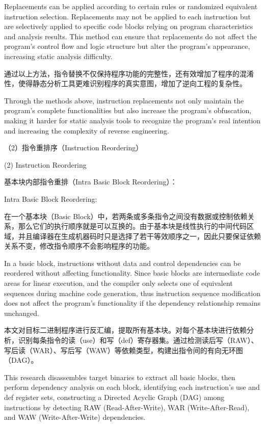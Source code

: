Replacements can be applied according to certain rules or randomized equivalent instruction selection. Replacements may not be applied to each instruction but are selectively applied to specific code blocks relying on program characteristics and analysis results. This method can ensure that replacements do not affect the program's control flow and logic structure but alter the program's appearance, increasing static analysis difficulty.

通过以上方法，指令替换不仅保持程序功能的完整性，还有效增加了程序的混淆性，使得静态分析工具更难识别程序的真实意图，增加了逆向工程的复杂性。

Through the methods above, instruction replacements not only maintain the program's complete functionalities but also increase the program's obfuscation, making it harder for static analysis tools to recognize the program's real intention and increasing the complexity of reverse engineering.

（2）指令重排序（Instruction Reordering）

(2) Instruction Reordering

基本块内部指令重排（Intra Basic Block Reordering）：

Intra Basic Block Reordering:

在一个基本块（Basic Block）中，若两条或多条指令之间没有数据或控制依赖关系，那么它们的执行顺序就是可以互换的。由于基本块是线性执行的中间代码区域，并且编译器在生成机器码时只是选择了若干等效顺序之一，因此只要保证依赖关系不变，修改指令顺序不会影响程序的功能。

In a basic block, instructions without data and control dependencies can be reordered without affecting functionality. Since basic blocks are intermediate code areas for linear execution, and the compiler only selects one of equivalent sequences during machine code generation, thus instruction sequence modification does not affect the program's functionality if the dependency relationship remains unchanged.

本文对目标二进制程序进行反汇编，提取所有基本块。对每个基本块进行依赖分析，识别每条指令的读（use）和写（def）寄存器集。通过检测读后写（RAW）、写后读（WAR）、写后写（WAW）等依赖类型，构建出指令间的有向无环图（DAG）。

This research disassembles target binaries to extract all basic blocks, then perform dependency analysis on each block, identifying each instruction's use and def register sets, constructing a Directed Acyclic Graph (DAG) among instructions by detecting RAW (Read-After-Write), WAR (Write-After-Read), and WAW (Write-After-Write) dependencies.

